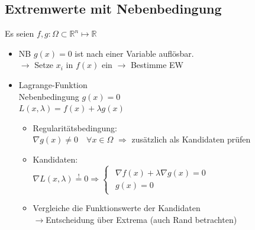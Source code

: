 \documentclass[6pt,a4paper]{scrartcl}
\newcommand{\Ra}[0]{\ensuremath{\Rightarrow}}									%
\newcommand{\ra}[0]{\ensuremath{\rightarrow}} 									%
\newcommand{\R}{\ensuremath{\mathbb R}}
\begin{document}
\begin{multicols*}{4}
\subsection{Extremwerte mit Nebenbedingung}
Es seien $f,g:\Omega \subset \R^n \mapsto \R$
\begin{itemize} \itemsep0pt
	\item NB $g(x) = 0$ ist nach einer Variable auflösbar. \\
	$\ra$ Setze $x_i$ in $f(x)$ ein $\ra$ Bestimme EW
	\item Lagrange-Funktion \\
	Nebenbedingung $g(x) = 0$\\
	$\boxed{L(x, \lambda) = f(x) + \lambda g(x)}$
	\begin{itemize} \itemsep0pt
		\item Regularitätsbedingung: \\
		$\nabla{g(x)} \neq 0 \quad \forall x \in \Omega$ $\Rightarrow$ zusätzlich als Kandidaten prüfen
		\item Kandidaten: \\
		$\nabla{L(x, \lambda)} \stackrel{!}{=} 0 \Ra \begin{cases}
		\begin{array}{r}
		\nabla{f(x)} + \lambda\nabla{g(x)} = 0 \\
		g(x) = 0
		\end{array}
		\end{cases}$
		\item Vergleiche die Funktionswerte der Kandidaten \\
		\ra Entscheidung über Extrema (auch Rand betrachten)
	\end{itemize}
\end{itemize}


\end{multicols*}
\end{document}
